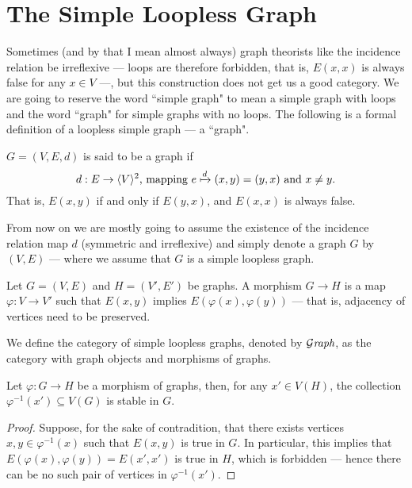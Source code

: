 \section{The Simple Loopless Graph}

Sometimes (and by that I mean almost always) graph theorists like the incidence
relation be irreflexive --- loops are therefore forbidden, that is, \(E(x, x)\)
is always false for any \(x \in V\) ---, but this construction does not get us a
good category. We are going to reserve the word ``simple graph" to mean a simple
graph with loops and the word ``graph" for simple graphs with no loops. The
following is a formal definition of a loopless simple graph --- a ``graph".

\begin{definition}[Graph]\label{def: graph}
  \(G = (V, E, d)\) is said to be a graph if
  \[
    d: E \to \langle V \rangle^2 \text{, mapping } e \xmapsto d (x, y) = (y, x)
    \text{ and } x \neq y.
  \]
  That is, \(E(x, y)\) if and only if \(E(y, x)\), and \(E(x, x)\) is always
  false.
\end{definition}

From now on we are mostly going to assume the existence of the incidence
relation map \(d\) (symmetric and irreflexive) and simply denote a graph \(G\)
by \((V, E)\) --- where we assume that \(G\) is a simple loopless graph.

\begin{definition}\label{def: graph-morph}
  Let \(G = (V, E)\) and \(H = (V', E')\) be graphs. A morphism \(G \to H\) is a
  map \(\varphi: V \to V'\) such that \(E(x, y)\) implies \(E(\varphi(x),
  \varphi(y))\) --- that is, adjacency of vertices need to be preserved.
\end{definition}

\begin{definition}\label{def: graph-cat}
  We define the category of simple loopless graphs, denoted by \({\mathcal{G}\textit{raph}}\), as
  the category with graph objects and morphisms of graphs.
\end{definition}

\begin{lemma}\label{lem: stable-preimage}
  Let \(\varphi: G \to H\) be a morphism of graphs, then, for any \(x' \in
  V(H)\), the collection \(\varphi^{-1}(x') \subseteq V(G)\) is stable in \(G\).
\end{lemma}

\begin{proof}
  Suppose, for the sake of contradition, that there exists vertices \(x, y \in
  \varphi^{-1}(x)\) such that \(E(x, y)\) is true in \(G\). In particular, this
  implies that \(E(\varphi(x), \varphi(y)) = E(x', x')\) is true in \(H\), which
  is forbidden --- hence there can be no such pair of vertices in
  \(\varphi^{-1}(x')\).
\end{proof}

